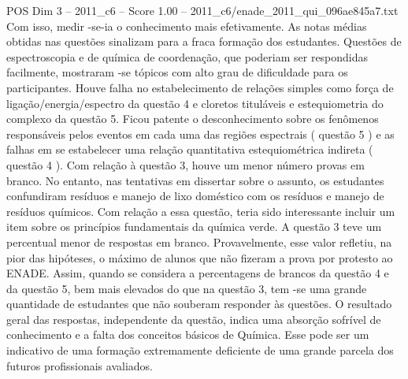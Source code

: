 \begin{textsample}{POS Dim 3 – 2011\_c6 – Score 1.00 – 2011\_c6/enade\_2011\_qui\_096ae845a7.txt}
Com isso, medir -se-ia o conhecimento mais efetivamente.
As notas médias obtidas nas questões sinalizam para a fraca formação dos estudantes.
Questões de espectroscopia e de química de coordenação, que poderiam ser respondidas facilmente, mostraram -se tópicos com alto grau de dificuldade para os participantes.
Houve falha no estabelecimento de relações simples como força de ligação/energia/espectro da questão 4 e cloretos tituláveis e estequiometria do complexo da questão 5.
Ficou patente o desconhecimento sobre os fenômenos responsáveis pelos eventos em cada uma das regiões espectrais ( questão 5 ) e as falhas em se estabelecer uma relação quantitativa estequiométrica indireta ( questão 4 ).
Com relação à questão 3, houve um menor número provas em branco.
No entanto, nas tentativas em dissertar sobre o assunto, os estudantes confundiram resíduos e manejo de lixo doméstico com os resíduos e manejo de resíduos químicos.
Com relação a essa questão, teria sido interessante incluir um item sobre os princípios fundamentais da química verde.
A questão 3 teve um percentual menor de respostas em branco.
Provavelmente, esse valor refletiu, na pior das hipóteses, o máximo de alunos que não fizeram a prova por protesto ao ENADE.
Assim, quando se considera a percentagens de brancos da questão 4 e da questão 5, bem mais elevados do que na questão 3, tem -se uma grande quantidade de estudantes que não souberam responder às questões.
O resultado geral das respostas, independente da questão, indica uma absorção sofrível de conhecimento e a falta dos conceitos básicos de Química.
Esse pode ser um indicativo de uma formação extremamente deficiente de uma grande parcela dos futuros profissionais avaliados.

\end{textsample}
